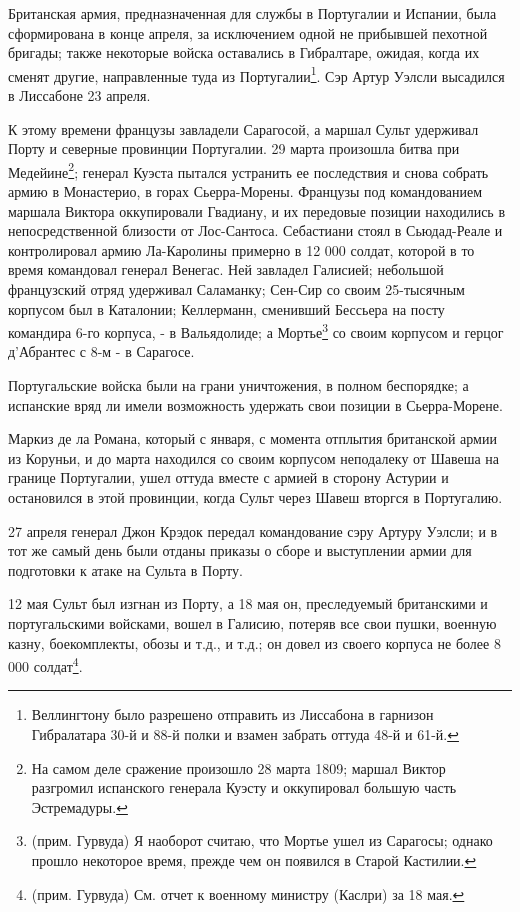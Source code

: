 \documentclass[
  oneside,
  12pt,
  titlepage]{book}
\begin{document}
Британская армия, предназначенная для службы в Португалии и Испании, была сформирована в конце апреля, за исключением одной не прибывшей пехотной бригады; также некоторые войска оставались в Гибралтаре, ожидая, когда их сменят другие, направленные туда из Португалии\footnote{Веллингтону было разрешено отправить из Лиссабона в гарнизон Гибралатара 30-й и 88-й полки и взамен забрать оттуда 48-й и 61-й.}. Сэр Артур Уэлсли высадился в Лиссабоне 23 апреля.

К этому времени французы завладели Сарагосой, а маршал Сульт удерживал Порту и северные провинции Португалии. 29 марта произошла битва при Медейине\footnote{На самом деле сражение произошло 28 марта 1809; маршал Виктор разгромил испанского генерала Куэсту и оккупировал большую часть Эстремадуры.}; генерал Куэста пытался устранить ее последствия и снова собрать армию в Монастерио, в горах Сьерра-Морены. Французы под командованием маршала Виктора оккупировали Гвадиану, и их передовые позиции находились в непосредственной близости от Лос-Сантоса. Себастиани стоял в Сьюдад-Реале и контролировал армию Ла-Каролины примерно в 12 000 солдат, которой в то время командовал генерал Венегас. Ней завладел Галисией; небольшой французский отряд удерживал Саламанку; Сен-Сир со своим 25-тысячным корпусом был в Каталонии; Келлерманн, сменивший Бессьера на посту командира 6-го корпуса, - в Вальядолиде; а Мортье\footnote{(прим. Гурвуда) Я наоборот считаю, что Мортье ушел из Сарагосы; однако прошло некоторое время, прежде чем он появился в Старой Кастилии.} со своим корпусом и герцог д'Абрантес с 8-м - в Сарагосе.

Португальские войска были на грани уничтожения, в полном беспорядке; а испанские вряд ли имели возможность удержать свои позиции в Сьерра-Морене.

Маркиз де ла Романа, который с января, с момента отплытия британской армии из Коруньи, и до марта находился со своим корпусом неподалеку от Шавеша на границе Португалии, ушел оттуда вместе с армией в сторону Астурии и остановился в этой провинции, когда Сульт через Шавеш вторгся в Португалию.

27 апреля генерал Джон Крэдок передал командование сэру Артуру Уэлсли; и в тот же самый день были отданы приказы о сборе и выступлении армии для подготовки к атаке на Сульта в Порту.

12 мая Сульт был изгнан из Порту, а 18 мая он, преследуемый британскими и португальскими войсками, вошел в Галисию, потеряв все свои пушки, военную казну, боекомплекты, обозы и т.д., и т.д.; он довел из своего корпуса не более 8 000 солдат\footnote{(прим. Гурвуда) См. отчет к военному министру (Каслри) за 18 мая.}.
\end{document}
